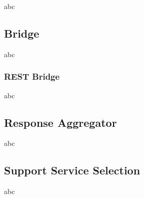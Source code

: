 abc

\subsection{Bridge}

abc

\subsubsection*{REST Bridge}

abc

\subsection{Response Aggregator}

abc

\subsection{Support Service Selection}

abc
